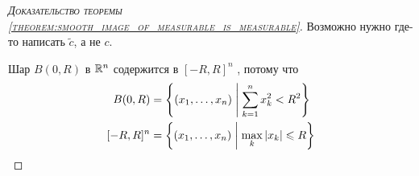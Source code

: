 \begin{proof}[\normalfont\textsc{Доказательство теоремы \ref{theorem:smooth_image_of_measurable_is_measurable}}]
 {\color{red} Возможно нужно где-то написать $\tilde c$, а не $c$.}

 Шар $B(0, R)$ в  $\mathbb{R}^{n}$ содержится в  $[-R, R]^{n}$ , потому что \begin{align*}
  B(0, R) &= \left\{ (x_1, \ldots, x_n) \;\middle|\; \sum_{k=1}^{n} x_k^{2} < R^{2} \right\} \\
  [- R, R]^{n} &= \left\{ (x_1, \ldots, x_n) \;\middle|\; \max_{k} \left| x_k \right| \leqslant R \right\}
 \end{align*} 
\end{proof}
